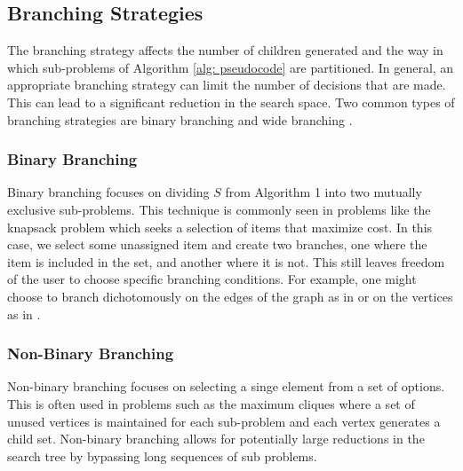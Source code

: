 \subsection{Branching Strategies}
	The branching strategy affects the number of children generated and the way in which sub-problems of Algorithm \ref{alg: pseudocode} are partitioned. 
	In general, an appropriate branching strategy can limit the number of decisions that are made.
	This can lead to a significant reduction in the search space. 
	Two common types of branching strategies are binary branching and wide branching \cite{morrison2016branch}.
	
	\subsubsection{Binary Branching}
		Binary branching focuses on dividing $S$ from Algorithm 1 into two mutually exclusive sub-problems. This technique is commonly seen in problems like the knapsack problem which seeks a selection of items that maximize cost. In this case, we select some unassigned item and create two branches, one where the item is included in the set, and another where it is not. This still leaves freedom of the user to choose specific branching conditions. For example, one might choose to branch dichotomously on the edges of the graph as in \cite{rendl2010solving} or on the vertices as in \cite{baccari2020verifying}.
	
	\subsubsection{Non-Binary Branching}
		Non-binary branching focuses on selecting a singe element from a set of options. This is often used in problems such as the maximum cliques where a set of unused vertices is maintained for each sub-problem and each vertex generates a child set. Non-binary branching allows for potentially large reductions in the search tree by bypassing long sequences of sub problems. 